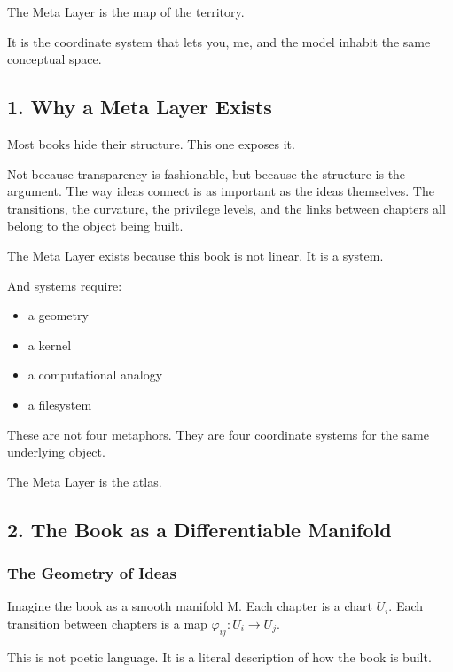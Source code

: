 The Meta Layer is the map of the territory.

It is the coordinate system that lets you, me, and the model inhabit the
same conceptual space.

\hypertarget{why-a-meta-layer-exists}{%
\subsection{1. Why a Meta Layer Exists}\label{why-a-meta-layer-exists}}

Most books hide their structure. This one exposes it.

Not because transparency is fashionable, but because the structure is
the argument. The way ideas connect is as important as the ideas
themselves. The transitions, the curvature, the privilege levels, and
the links between chapters all belong to the object being built.

The Meta Layer exists because this book is not linear. It is a system.

And systems require:

\begin{itemize}
\tightlist
\item
  a geometry
\item
  a kernel
\item
  a computational analogy
\item
  a filesystem
\end{itemize}

These are not four metaphors. They are four coordinate systems for the
same underlying object.

The Meta Layer is the atlas.

\hypertarget{the-book-as-a-differentiable-manifold}{%
\subsection{2. The Book as a Differentiable
Manifold}\label{the-book-as-a-differentiable-manifold}}

\hypertarget{the-geometry-of-ideas}{%
\subsubsection{The Geometry of Ideas}\label{the-geometry-of-ideas}}

Imagine the book as a smooth manifold M. Each chapter is a chart
\(U_i\). Each transition between chapters is a map
\(\varphi_{ij}: U_i \to U_j\).

This is not poetic language. It is a literal description of how the book
is built.

